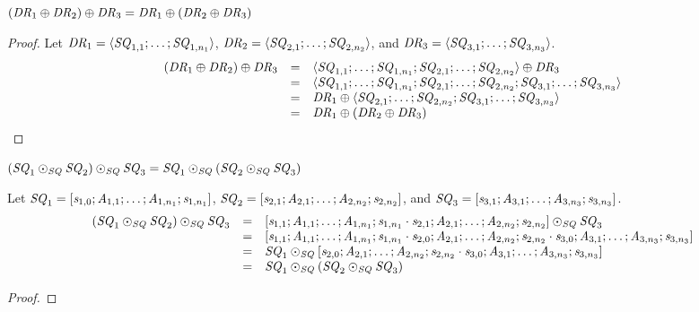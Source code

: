 \documentclass[numbers,10pt,preprint\ifanon ,nocopyrightspace\fi]{sigplanconf}
\begin{document}
\begin{lemma}
  \label{lem:dnf-or-assoc}
  $(\mathit{DR}_1 \oplus \mathit{DR}_2) \oplus \mathit{DR}_3 =
  \mathit{DR}_1 \oplus (\mathit{DR}_2 \oplus \mathit{DR}_3)$
\end{lemma}
\begin{proof}
  Let $\mathit{DR}_1 = \langle\mathit{SQ}_{1,1};\ldots;\mathit{SQ}_{1,n_1}\rangle$,
  $\mathit{DR}_2 = \langle\mathit{SQ}_{2,1};\ldots;\mathit{SQ}_{2,n_2}\rangle$, and
  $\mathit{DR}_3 = \langle\mathit{SQ}_{3,1};\ldots;\mathit{SQ}_{3,n_3}\rangle$.
  \[
    \begin{array}{rcl}
      (\mathit{DR}_1 \oplus \mathit{DR}_2) \oplus \mathit{DR}_3
      & = & \langle\mathit{SQ}_{1,1};\ldots;\mathit{SQ}_{1,n_1};
            \mathit{SQ}_{2,1};\ldots;\mathit{SQ}_{2,n_2}\rangle \oplus \mathit{DR}_3\\
      & = & \langle\mathit{SQ}_{1,1};\ldots;\mathit{SQ}_{1,n_1};
            \mathit{SQ}_{2,1};\ldots;\mathit{SQ}_{2,n_2};
            \mathit{SQ}_{3,1};\ldots;\mathit{SQ}_{3,n_3}\rangle\\
      & = & \mathit{DR}_1 \oplus
            \langle\mathit{SQ}_{2,1};\ldots;\mathit{SQ}_{2,n_2};
            \mathit{SQ}_{3,1};\ldots;\mathit{SQ}_{3,n_3}\rangle\\
      & = & \mathit{DR}_1 \oplus (\mathit{DR}_2 \oplus \mathit{DR}_3)
    \end{array}
  \]
\end{proof}

\begin{lemma}
  \label{lem:sequence-concat-assoc}
  $(\mathit{SQ}_1 \odot_{\mathit{SQ}} \mathit{SQ}_2) \odot_{\mathit{SQ}} \mathit{SQ}_3 =
  \mathit{SQ}_1 \odot_{\mathit{SQ}} (\mathit{SQ}_2 \odot_{\mathit{SQ}} \mathit{SQ}_3)$
\end{lemma}
  Let $\mathit{SQ}_1 =
  [\mathit{s}_{1,0};\mathit{A}_{1,1};\ldots;\mathit{A}_{1,n_1};\mathit{s}_{1,n_1}]$,
  $\mathit{SQ}_2 =
  [\mathit{s}_{2,1};\mathit{A}_{2,1};\ldots;\mathit{A}_{2,n_2};\mathit{s}_{2,n_2}]$,
  and $\mathit{SQ}_3 =
  [\mathit{s}_{3,1};\mathit{A}_{3,1};\ldots;\mathit{A}_{3,n_3};\mathit{s}_{3,n_3}]$.
  \[
    \begin{array}{rcl}
      (\mathit{SQ}_1 \odot_{\mathit{SQ}} \mathit{SQ}_2) \odot_{\mathit{SQ}} \mathit{SQ}_3
      & = & [\mathit{s}_{1,1};\mathit{A}_{1,1};\ldots;\mathit{A}_{1,n_1};
            \mathit{s}_{1,n_1}\cdot\mathit{s}_{2,1};
            \mathit{A}_{2,1};\ldots;\mathit{A}_{2,n_2};\mathit{s}_{2,n_2}]
            \odot_{\mathit{SQ}} \mathit{SQ}_3\\
      & = & [\mathit{s}_{1,1};\mathit{A}_{1,1};\ldots;\mathit{A}_{1,n_1};
            \mathit{s}_{1,n_1}\cdot\mathit{s}_{2,0};
            \mathit{A}_{2,1};\ldots;\mathit{A}_{2,n_2};
            \mathit{s}_{2,n_2}\cdot\mathit{s}_{3,0};
            \mathit{A}_{3,1};\ldots;\mathit{A}_{3,n_3};\mathit{s}_{3,n_3}]\\
      & = & \mathit{SQ}_1 \odot_{\mathit{SQ}}
            [\mathit{s}_{2,0};
            \mathit{A}_{2,1};\ldots;\mathit{A}_{2,n_2};
            \mathit{s}_{2,n_2}\cdot\mathit{s}_{3,0};
            \mathit{A}_{3,1};\ldots;\mathit{A}_{3,n_3};\mathit{s}_{3,n_3}]\\
      & = & \mathit{SQ}_1 \odot_{\mathit{SQ}} (\mathit{SQ}_2 \odot_{\mathit{SQ}} \mathit{SQ}_3)
    \end{array}
  \]
\begin{proof}
  
\end{proof}
\end{document}
